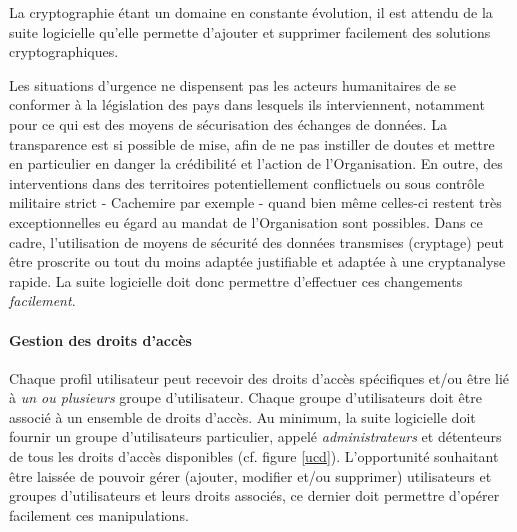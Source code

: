 La cryptographie étant un domaine en constante évolution, il est attendu de la suite logicielle qu'elle permette d'ajouter et supprimer facilement des solutions cryptographiques. 
\begin{constraint}
Les situations d'urgence ne dispensent pas les acteurs humanitaires de se conformer à la législation des pays dans lesquels ils interviennent, notamment pour ce qui est des moyens de sécurisation des échanges de données. La transparence est si possible de mise, afin de ne pas instiller de doutes et mettre en particulier en danger la crédibilité et l'action de l'Organisation. En outre, des interventions dans des territoires potentiellement conflictuels ou sous contrôle militaire strict - Cachemire par exemple - quand bien même celles-ci restent très exceptionnelles eu égard au mandat de l'Organisation sont possibles. Dans ce cadre, l'utilisation de moyens de sécurité des données transmises (cryptage) peut être proscrite ou tout du moins adaptée justifiable et adaptée à une cryptanalyse \og{}rapide\fg{}. La suite logicielle doit donc permettre d'effectuer ces changements \emph{facilement}.
\end{constraint}

\paragraph{Gestion des droits d'accès}
Chaque profil utilisateur peut recevoir des droits d'accès spécifiques et/ou être lié à \emph{un ou plusieurs} groupe d'utilisateur.
Chaque groupe d'utilisateurs doit être associé à un ensemble de droits d'accès.
Au minimum, la suite logicielle doit fournir un groupe d'utilisateurs particulier, appelé \emph{administrateurs} et détenteurs de tous les droits d'accès disponibles (cf. figure \ref{ucd}). L'opportunité souhaitant être laissée de pouvoir gérer (ajouter, modifier et/ou supprimer) utilisateurs et groupes d'utilisateurs et leurs droits associés, ce dernier doit permettre d'opérer facilement ces manipulations.


